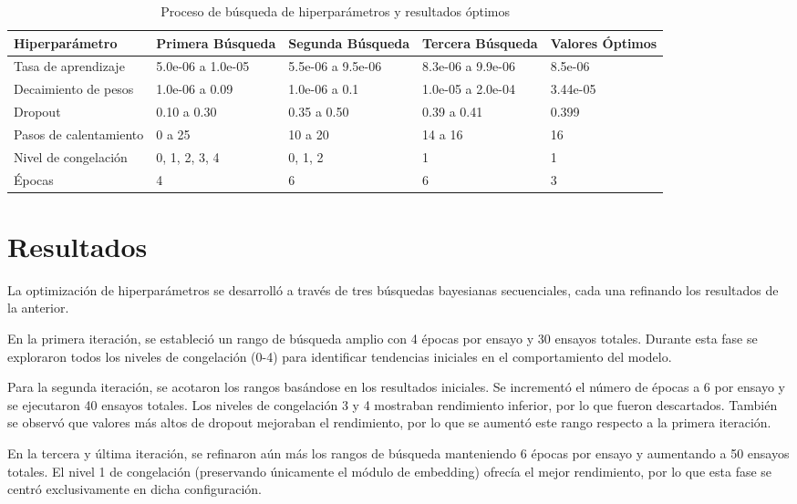 \begin{table}[htbp]
    \centering
    \caption{Proceso de búsqueda de hiperparámetros y resultados óptimos}
    \label{tabla:hiperparametros}
    \begin{tabular}{|l|p{2.6cm}|p{2.6cm}|p{2.6cm}|p{2cm}|}
        \hline
        \textbf{Hiperparámetro} & \textbf{Primera Búsqueda} & \textbf{Segunda Búsqueda} & \textbf{Tercera Búsqueda} & \textbf{Valores Óptimos} \\
        \hline
        Tasa de aprendizaje & 5.0e-06 a 1.0e-05 & 5.5e-06 a 9.5e-06 & 8.3e-06 a 9.9e-06 & 8.5e-06 \\
        \hline
        Decaimiento de pesos & 1.0e-06 a 0.09 & 1.0e-06 a 0.1 & 1.0e-05 a 2.0e-04 & 3.44e-05 \\
        \hline
        Dropout & 0.10 a 0.30 & 0.35 a 0.50 & 0.39 a 0.41 & 0.399 \\
        \hline
        Pasos de calentamiento & 0 a 25 & 10 a 20 & 14 a 16 & 16 \\
        \hline
        Nivel de congelación & 0, 1, 2, 3, 4 & 0, 1, 2 & 1 & 1 \\
        \hline
        Épocas & 4 & 6 & 6 & 3 \\
        \hline
    \end{tabular}
\end{table}

\section{Resultados}
La optimización de hiperparámetros se desarrolló a través de tres búsquedas bayesianas secuenciales, cada una refinando los resultados de la anterior.

En la primera iteración, se estableció un rango de búsqueda amplio con 4 épocas por ensayo y 30 ensayos totales. Durante esta fase se exploraron todos los niveles de congelación (0-4) para identificar tendencias iniciales en el comportamiento del modelo.

Para la segunda iteración, se acotaron los rangos basándose en los resultados iniciales. Se incrementó el número de épocas a 6 por ensayo y se ejecutaron 40 ensayos totales. Los niveles de congelación 3 y 4 mostraban rendimiento inferior, por lo que fueron descartados. También se observó que valores más altos de dropout mejoraban el rendimiento, por lo que se aumentó este rango respecto a la primera iteración.

En la tercera y última iteración, se refinaron aún más los rangos de búsqueda manteniendo 6 épocas por ensayo y aumentando a 50 ensayos totales. El nivel 1 de congelación (preservando únicamente el módulo de embedding) ofrecía el mejor rendimiento, por lo que esta fase se centró exclusivamente en dicha configuración.

